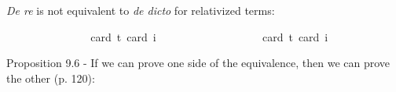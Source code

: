 \begin{isabellebody}
\begin{isamarkuptext}
\emph{De re} is not equivalent to \emph{de dicto} for relativized terms:%
\end{isamarkuptext}\isamarkuptrue%
\isamarkupfalse%
\ {\isachardoublequoteopen}{\isasymlfloor}\isactrlbold {\isasymforall}{\isasymalpha}{\isachardot}\ {\isacharparenleft}{\isacharparenleft}{\isasymlambda}{\isasymbeta}{\isachardot}\ \isactrlbold {\isasymbox}{\isacharparenleft}{\isasymalpha}\ {\isasymbeta}{\isacharparenright}{\isacharparenright}\ {\isasymdownharpoonleft}{\isacharparenleft}{\isasymtau}{\isacharcolon}{\isacharcolon}{\isasymup}{\isasymzero}{\isacharparenright}{\isacharparenright}\ \isactrlbold {\isasymleftrightarrow}\ \isactrlbold {\isasymbox}{\isacharparenleft}\ {\isacharparenleft}{\isasymlambda}{\isasymbeta}{\isachardot}\ {\isacharparenleft}{\isasymalpha}\ {\isasymbeta}{\isacharparenright}{\isacharparenright}\ {\isasymdownharpoonleft}{\isasymtau}{\isacharparenright}{\isasymrfloor}{\isachardoublequoteclose}\ \isanewline
\ \ \isamarkupfalse%
{\isacharbrackleft}card\ {\isacharprime}t{\isacharequal}{}{\isacharcomma}\ card\ i{\isacharequal}{}{\isacharbrackright}%
\ %
%
\isamarkupfalse%
\ %
%
%
%
\isanewline
{}\isamarkupfalse%
\ {\isachardoublequoteopen}{\isasymlfloor}\isactrlbold {\isasymforall}{\isasymalpha}{\isachardot}\ {\isacharparenleft}{\isacharparenleft}{\isasymlambda}{\isasymbeta}{\isachardot}\ \isactrlbold {\isasymbox}{\isacharparenleft}{\isasymalpha}\ {\isasymbeta}{\isacharparenright}{\isacharparenright}\ \isactrlbold {\isasymdown}{\isacharparenleft}{\isasymtau}{\isacharcolon}{\isacharcolon}{\isasymup}{\isasymlangle}{\isasymzero}{\isasymrangle}{\isacharparenright}{\isacharparenright}\ \isactrlbold {\isasymleftrightarrow}\ \isactrlbold {\isasymbox}{\isacharparenleft}\ {\isacharparenleft}{\isasymlambda}{\isasymbeta}{\isachardot}\ {\isacharparenleft}{\isasymalpha}\ {\isasymbeta}{\isacharparenright}{\isacharparenright}\ \isactrlbold {\isasymdown}{\isasymtau}{\isacharparenright}{\isasymrfloor}{\isachardoublequoteclose}\ \isanewline
\ \ \isamarkupfalse%
{\isacharbrackleft}card\ {\isacharprime}t{\isacharequal}{}{\isacharcomma}\ card\ i{\isacharequal}{}{\isacharbrackright}%
\ %
%
\isamarkupfalse%
\ %
%
%
%
%
\begin{isamarkuptext}%
Proposition 9.6 - If we can prove one side of the equivalence, then we can prove the other (p. 120):%
\end{isamarkuptext}\isamarkuptrue%

\end{isabellebody}
